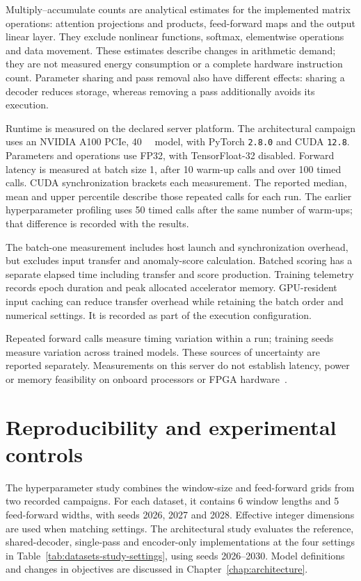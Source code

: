 Multiply--accumulate counts are analytical estimates for the implemented
matrix operations: attention projections and products, feed-forward maps
and the output linear layer. They exclude nonlinear functions, softmax,
elementwise operations and data movement. These estimates describe changes
in arithmetic demand; they are not measured energy consumption or a
complete hardware instruction count. Parameter sharing and pass removal
also have different effects: sharing a decoder reduces storage, whereas
removing a pass additionally avoids its execution.

Runtime is measured on the declared server platform. The architectural
campaign uses an NVIDIA A100 PCIe, \SI{40}{\giga\byte} model, with PyTorch
\texttt{2.8.0} and CUDA \texttt{12.8}. Parameters and operations use FP32, with
TensorFloat-32 disabled. Forward latency is measured at batch size
\num{1}, after \num{10} warm-up calls and over \num{100} timed calls.
CUDA synchronization brackets each measurement. The reported median,
mean and upper percentile describe those repeated calls for each run.
The earlier hyperparameter profiling uses \num{50} timed calls after the
same number of warm-ups; that difference is recorded with the results.

The batch-one measurement includes host launch and synchronization overhead,
but excludes input transfer and anomaly-score calculation. Batched scoring
has a separate elapsed time including transfer and score production.
Training telemetry records epoch duration and peak allocated accelerator
memory. GPU-resident input caching can reduce transfer overhead while
retaining the batch order and numerical settings. It is recorded as part
of the execution configuration.

Repeated forward calls measure timing variation within a run; training
seeds measure variation across trained models. These sources of uncertainty
are reported separately. Measurements on this server do not establish
latency, power or memory feasibility on onboard processors or
\ac{FPGA} hardware~\cite{Sze2017EfficientDNN}.

\section{Reproducibility and experimental controls}
\label{sec:datasets-reproducibility}
The hyperparameter study combines the window-size and feed-forward grids
from two recorded campaigns. For each dataset, it contains \num{6} window
lengths and \num{5} feed-forward widths, with seeds
\num{2026}, \num{2027} and \num{2028}. Effective integer dimensions are
used when matching settings. The architectural study evaluates the
reference, shared-decoder, single-pass and encoder-only implementations
at the four settings in Table~\ref{tab:datasets-study-settings}, using
seeds \num{2026}--\num{2030}. Model definitions and changes in objectives
are discussed in Chapter~\ref{chap:architecture}.

